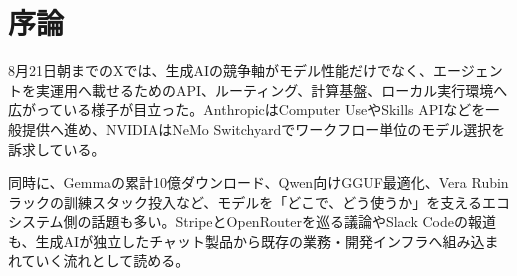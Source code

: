 \section*{序論}
8月21日朝までのXでは、生成AIの競争軸がモデル性能だけでなく、エージェントを実運用へ載せるためのAPI、ルーティング、計算基盤、ローカル実行環境へ広がっている様子が目立った。AnthropicはComputer UseやSkills APIなどを一般提供へ進め、NVIDIAはNeMo Switchyardでワークフロー単位のモデル選択を訴求している。

同時に、Gemmaの累計10億ダウンロード、Qwen向けGGUF最適化、Vera Rubinラックの訓練スタック投入など、モデルを「どこで、どう使うか」を支えるエコシステム側の話題も多い。StripeとOpenRouterを巡る議論やSlack Codeの報道も、生成AIが独立したチャット製品から既存の業務・開発インフラへ組み込まれていく流れとして読める。

